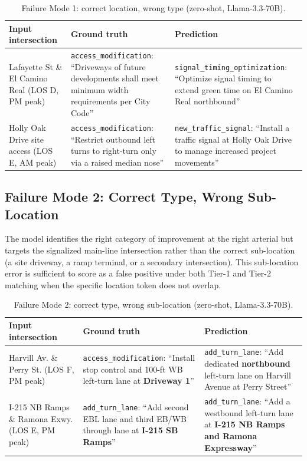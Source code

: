 \documentclass[preprint,12pt]{elsarticle}
\begin{document}
\begin{table}[h]
\centering
\caption{Failure Mode 1: correct location, wrong type (zero-shot, Llama-3.3-70B).}
\begin{tabular}{p{3.0cm}p{4.2cm}p{4.2cm}}
\toprule
Input intersection & Ground truth & Prediction \\
\midrule
Lafayette St \& El Camino Real (LOS D, PM peak) &
\texttt{access\_modification}: ``Driveways of future developments shall meet minimum width requirements per City Code'' &
\texttt{signal\_timing\_optimization}: ``Optimize signal timing to extend green time on El Camino Real northbound'' \\
\addlinespace
Holly Oak Drive site access (LOS E, AM peak) &
\texttt{access\_modification}: ``Restrict outbound left turns to right-turn only via a raised median nose'' &
\texttt{new\_traffic\_signal}: ``Install a traffic signal at Holly Oak Drive to manage increased project movements'' \\
\bottomrule
\end{tabular}
\end{table}

\subsection*{Failure Mode 2: Correct Type, Wrong Sub-Location}

The model identifies the right category of improvement at the right arterial
but targets the signalized main-line intersection rather than the correct
sub-location (a site driveway, a ramp terminal, or a secondary intersection).
This sub-location error is sufficient to score as a false positive under
both Tier-1 and Tier-2 matching when the specific location token does not overlap.

\begin{table}[h]
\centering
\caption{Failure Mode 2: correct type, wrong sub-location (zero-shot, Llama-3.3-70B).}
\begin{tabular}{p{3.0cm}p{4.2cm}p{4.2cm}}
\toprule
Input intersection & Ground truth & Prediction \\
\midrule
Harvill Av. \& Perry St. (LOS F, PM peak) &
\texttt{access\_modification}: ``Install stop control and 100-ft WB left-turn lane at \textbf{Driveway 1}'' &
\texttt{add\_turn\_lane}: ``Add dedicated \textbf{northbound} left-turn lane on Harvill Avenue at Perry Street'' \\
\addlinespace
I-215 NB Ramps \& Ramona Exwy. (LOS E, PM peak) &
\texttt{add\_turn\_lane}: ``Add second EBL lane and third EB/WB through lane at \textbf{I-215 SB Ramps}'' &
\texttt{add\_turn\_lane}: ``Add a westbound left-turn lane at \textbf{I-215 NB Ramps and Ramona Expressway}'' \\
\bottomrule
\end{tabular}
\end{table}
\end{document}
